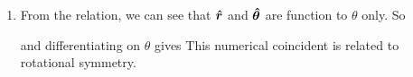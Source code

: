 \documentclass[class=article, crop=false, 12pt]{standalone}
\begin{document}
\begin{enumerate}
\begin{proof}
\begin{itemize}
            \item We want $\hhat{\theta}$ to be perpendicular to $\hhat{r}$ and also have a length of $1$.
            Let $\hhat{\theta} = (\theta_x) \hhat{x} + (\theta_y) \hhat{y}$, then
        \end{itemize}
        
    \end{proof}

    \item From the relation, we can see that $\hhat{r}$ and $\hhat{\theta}$ are function to $\theta$ only. So

    and differentiating on $\theta$ gives
    This numerical coincident is related to rotational symmetry.


\end{enumerate}
\end{document}
